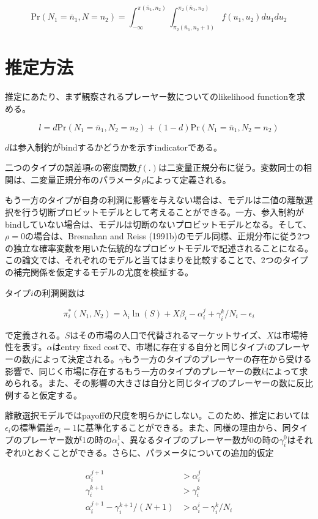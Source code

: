 \documentclass[11pt]{jsarticle}
\begin{document}
\[
\text{Pr}(N_1 = \bar{n}_1, N = n_2) = \int_{- \infty}^{\pi(\bar{n}_1, n_2)} \int_{\pi_2(\bar{n}_1, n_2 + 1)}^{\pi_2(\bar{n}_1, n_2)} f(u_1, u_2) du_1 du_2
\]


\section{推定方法}

推定にあたり、まず観察されるプレーヤー数についてのlikelihood functionを求める。

\[
l = d \text{Pr}(N_1 = \bar{n}_1, N_2 = n_2) + (1-d) \text{Pr}(N_1 = \bar{n}_1, N_2 = n_2)
\]

$d$は参入制約がbindするかどうかを示すindicatorである。

二つのタイプの誤差項$\epsilon$の密度関数$f(.)$は二変量正規分布に従う。変数同士の相関は、二変量正規分布のパラメータ$\rho$によって定義される。

もう一方のタイプが自身の利潤に影響を与えない場合は、モデルは二値の離散選択を行う切断プロビットモデルとして考えることができる。一方、参入制約がbindしていない場合は、モデルは切断のないプロビットモデルとなる。そして、$\rho=0$の場合は、Bresnahan and Reiss (1991b)のモデル同様、正規分布に従う2つの独立な確率変数を用いた伝統的なプロビットモデルで記述されることになる。この論文では、それぞれのモデルと当てはまりを比較することで、2つのタイプの補完関係を仮定するモデルの尤度を検証する。

タイプ$i$の利潤関数は

\[
\pi_i^*(N_1, N_2) = \lambda_i \ln(S) + X \beta_i - \alpha_i^j + \gamma_i^k/ N_i - \epsilon_i
\]

で定義される。$S$はその市場の人口で代替されるマーケットサイズ、$X$は市場特性を表す。$\alpha$はentry fixed costで、市場に存在する自分と同じタイプ$i$のプレーヤーの数$j$によって決定される。$\gamma$もう一方のタイプのプレーヤーの存在から受ける影響で、同じく市場に存在するもう一方のタイプのプレーヤーの数$k$によって求められる。また、その影響の大きさは自分と同じタイプのプレーヤーの数に反比例すると仮定する。

離散選択モデルではpayoffの尺度を明らかにしない。このため、推定においては$\epsilon_i$の標準偏差$\sigma_i=1$に基準化することができる。また、同様の理由から、同タイプのプレーヤー数が1の時の$\alpha_i^1$、異なるタイプのプレーヤー数が0の時の$\gamma_i^0$はそれぞれ0とおくことができる。さらに、パラメータについての追加的仮定

\begin{align*}
  \alpha_i^{j+1} &> \alpha_i^j \\
  \gamma_i^{k+1} &> \gamma_i^k \\
  \alpha_i^{j+1} - \gamma_i^{k+1}/(N+1) &> \alpha_i^i - \gamma_i^k /N_i
\end{align*}
\end{document}
